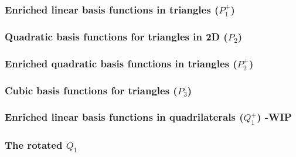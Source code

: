 

\subsubsection{Enriched linear basis functions in triangles ($P_1^+$)}



\subsubsection{Quadratic basis functions for triangles in 2D ($P_2$)}



\subsubsection{Enriched quadratic basis functions in triangles ($P_2^+$)}



\subsubsection{Cubic basis functions for triangles ($P_3$)}



\subsubsection{Enriched linear basis functions in quadrilaterals ($Q_1^+$) -WIP} \label{ss:quadmini}



\subsubsection{The rotated $Q_1$} \label{ss:rq1}

